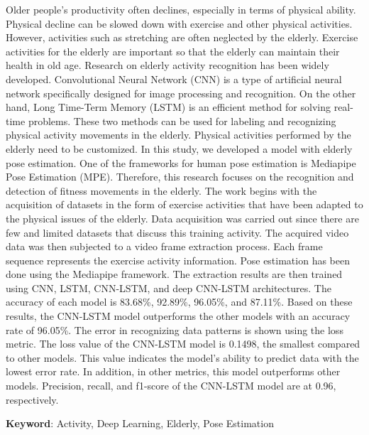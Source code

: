 \begin{spacing}{1}
    
    Older people's productivity often declines, especially in terms of physical ability. Physical decline can be slowed down with exercise and other physical activities. However, activities such as stretching are often neglected by the elderly. Exercise activities for the elderly are important so that the elderly can maintain their health in old age. Research on elderly activity recognition has been widely developed. Convolutional Neural Network (CNN) is a type of artificial neural network specifically designed for image processing and recognition. On the other hand, Long Time-Term Memory (LSTM) is an efficient method for solving real-time problems. These two methods can be used for labeling and recognizing physical activity movements in the elderly. Physical activities performed by the elderly need to be customized. In this study, we developed a model with elderly pose estimation. One of the frameworks for human pose estimation is Mediapipe Pose Estimation (MPE). Therefore, this research focuses on the recognition and detection of fitness movements in the elderly. The work begins with the acquisition of datasets in the form of exercise activities that have been adapted to the physical issues of the elderly. Data acquisition was carried out since there are few and limited datasets that discuss this training activity. The acquired video data was then subjected to a video frame extraction process. Each frame sequence represents the exercise activity information. Pose estimation has been done using the Mediapipe framework. The extraction results are then trained using CNN, LSTM, CNN-LSTM, and deep CNN-LSTM architectures. The accuracy of each model is 83.68\%, 92.89\%, 96.05\%, and 87.11\%. Based on these results, the CNN-LSTM model outperforms the other models with an accuracy rate of 96.05\%. The error in recognizing data patterns is shown using the loss metric. The loss value of the CNN-LSTM model is 0.1498, the smallest compared to other models. This value indicates the model's ability to predict data with the lowest error rate. In addition, in other metrics, this model outperforms other models. Precision, recall, and f1-score of the CNN-LSTM model are at 0.96, respectively.

    \vspace{2ex}
    \textbf{Keyword}: Activity, Deep Learning, Elderly, Pose Estimation
\end{spacing}